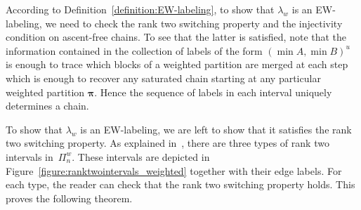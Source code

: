 \documentclass[11pt]{article}
\theoremstyle{definition}
\numberwithin{equation}{section}
\newcommand{\bpi}{\pmb{\pi}}
\begin{document}
According to Definition~\ref{definition:EW-labeling}, to show that $\lambda_w$ is an EW-labeling, we  need to check the rank two switching property and the injectivity condition on ascent-free chains.  To see that the latter is satisfied, note that the information contained in the collection of labels of the form $(\min A, \min B)^u$ is enough to trace which blocks of a weighted partition are merged at each step which is enough to recover any saturated chain starting at any particular weighted partition $\bpi$. Hence the sequence of labels in each interval 
uniquely determines a chain. 

To show that $\lambda_w$ is an EW-labeling, we are left to show that it 
satisfies the rank two switching property.
 As explained in~\cite{GonzalezDleonWachs2016}, there are three types of rank two intervals in~$\Pi_n^w$. These intervals are depicted in Figure~\ref{figure:ranktwointervals_weighted} together with their edge labels.   
 For each type, the reader can check that the rank two switching property holds. This proves the following theorem.
\end{document}
